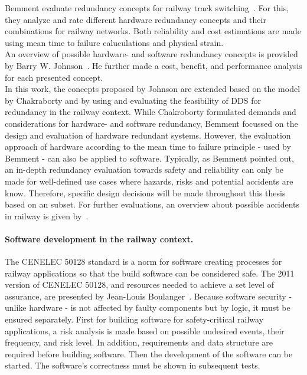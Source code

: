 Bemment \etal evaluate redundancy concepts for railway track switching~\cite{BemmentEvaluationOfRedundancy}.
For this, they analyze and rate different hardware redundancy concepts and their combinations for railway networks.
Both reliability and cost estimations are made using mean time to failure caluculations and physical strain.
\\

An overview of possible hardware- and software redundancy concepts is provided by Barry W. Johnson~\cite{BarryFaultToleranceAnalysis}.
He further made a cost, benefit, and performance analysis for each presented concept.
\\

In this work, the concepts proposed by Johnson are extended based on the model by Chakraborty and by using and evaluating the feasibility of \gls*{DDS} for redundancy in the railway context.
While Chakroborty formulated demands and considerations for hardware- and software redundancy, Bemment \etal focussed on the design and evaluation of hardware redundant systems.
However, the evaluation approach of hardware according to the mean time to failure principle - used by Bemment \etal - can also be applied to software.
Typically, as Bemment \etal pointed out, an in-depth redundancy evaluation towards safety and reliability can only be made for well-defined use cases where hazards, risks and potential accidents are know.
Therefore, specific design decisions will be made throughout this thesis based on an  subset.
For further evaluations, an overview about possible accidents in railway is given by~\cite{ERTMSRailwayAccidents}.


\paragraph{Software development in the railway context.}
The CENELEC 50128 standard is a norm for software creating processes for railway applications so that the build software can be considered safe.
The 2011 version of CENELEC 50128, and resources needed to achieve a set level of assurance, are presented by Jean-Louis Boulanger~\cite{BoulangerStandards}.
Because software security - unlike hardware - is not affected by faulty components but by logic, it must be ensured separately.
First for building software for safety-critical railway applications, a risk analysis is made based on possible undesired events, their frequency, and risk level.
In addition, requirements and data structure are required before building software.
Then the development of the software can be started.
The software's correctness must be shown in subsequent tests.
\\

